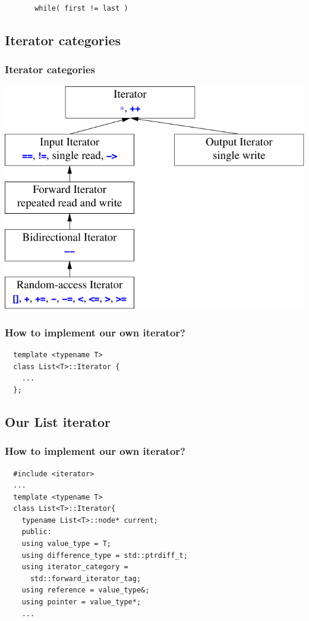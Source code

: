 \begin{frame}[fragile]
  \vfill
  \begin{lstlisting}
       while( first != last )
  \end{lstlisting}
  \vfill
\end{frame}


\subsection{Iterator categories}
\begin{frame}
  \frametitle{Iterator categories}
  \centering
  \includegraphics[height=0.8\textheight]{img/iterators.png}
\end{frame}

\begin{frame}[fragile]
  \frametitle{How to implement our own iterator?}
\begin{lstlisting}
  template <typename T>
  class List<T>::Iterator {
    ...
  };
\end{lstlisting}
\end{frame}

\subsection{Our List iterator}
\begin{frame}[fragile]
  \frametitle{How to implement our own iterator?}
\begin{lstlisting}
  #include <iterator>
  ...
  template <typename T>
  class List<T>::Iterator{
    typename List<T>::node* current;
    public:
    using value_type = T;
    using difference_type = std::ptrdiff_t;
    using iterator_category =
      std::forward_iterator_tag;
    using reference = value_type&;
    using pointer = value_type*;
    ...
\end{lstlisting}
\end{frame}

